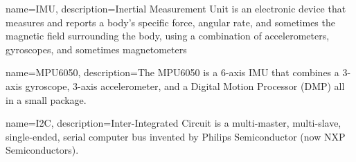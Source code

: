 {
	name=IMU,
	description={Inertial Measurement Unit is an electronic device that measures and reports a body's specific force, angular rate, and sometimes the magnetic field surrounding the body, using a combination of accelerometers, gyroscopes, and sometimes magnetometers}
}

{
	name=MPU6050,
	description={The MPU6050 is a 6-axis IMU that combines a 3-axis gyroscope, 3-axis accelerometer, and a Digital Motion Processor (DMP) all in a small package.}
}

{
	name=I2C,
	description={Inter-Integrated Circuit is a multi-master, multi-slave, single-ended, serial computer bus invented by Philips Semiconductor (now NXP Semiconductors).}
}
